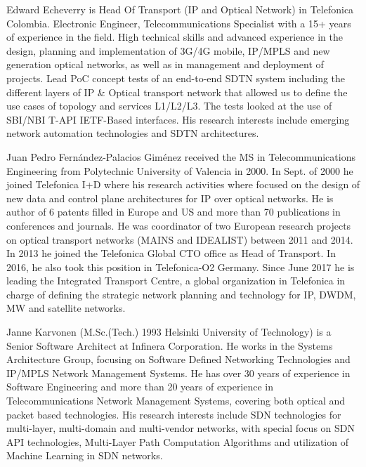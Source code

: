 \documentclass[10pt, conference]{IEEEtran}
\begin{document}
\begin{IEEEbiography}Edward Echeverry is Head Of Transport (IP and Optical Network) in Telefonica Colombia. Electronic Engineer, Telecommunications Specialist with a 15+ years of experience in the field. High technical skills and advanced experience in the design, planning and implementation of 3G/4G mobile, IP/MPLS and new generation optical networks, as well as in management and deployment of projects. Lead PoC concept tests of an end-to-end SDTN system including the different layers of IP \& Optical transport network that allowed us to define the use cases of topology and services L1/L2/L3. The tests looked at the use of SBI/NBI T-API IETF-Based interfaces. His research interests include emerging network automation technologies and SDTN architectures.\end{IEEEbiography}

\begin{IEEEbiography}Juan Pedro Fernández-Palacios Giménez received the MS in Telecommunications Engineering from Polytechnic University of Valencia in 2000. In Sept. of 2000 he joined Telefonica I+D where his research activities where focused on the design of new data and control plane architectures for IP over optical networks. He is author of 6 patents filled in Europe and US and more than 70 publications in conferences and journals. He was coordinator of two European research projects on optical transport networks (MAINS and IDEALIST) between 2011 and 2014. In 2013 he joined the Telefonica Global CTO office as Head of Transport. In 2016, he also took this position in Telefonica-O2 Germany. Since June 2017 he is leading the Integrated Transport Centre, a global organization in Telefonica in charge of defining the strategic network planning and technology for IP, DWDM, MW and satellite networks.\end{IEEEbiography}

\begin{IEEEbiography}Janne Karvonen (M.Sc.(Tech.) 1993 Helsinki University of Technology) is a Senior Software Architect at Infinera Corporation. He works in the Systems Architecture Group, focusing on Software Defined Networking Technologies and IP/MPLS Network Management Systems. He has over 30 years of experience in Software Engineering and more than 20 years of experience in Telecommunications Network Management Systems, covering both optical and packet based technologies. His research interests include SDN technologies for multi-layer, multi-domain and multi-vendor networks, with special focus on SDN API technologies, Multi-Layer Path Computation Algorithms and utilization of Machine Learning in SDN networks.\end{IEEEbiography}
\end{document}
